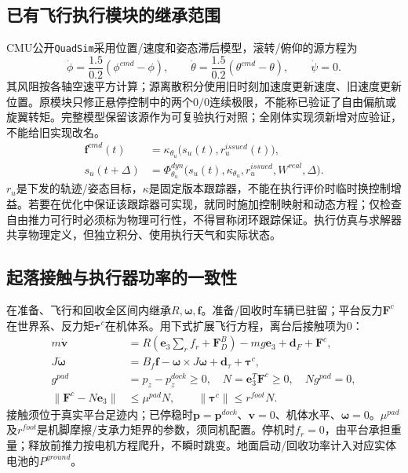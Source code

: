 \subsection*{已有飞行执行模块的继承范围}
\noindent CMU公开\texttt{QuadSim}采用位置/速度和姿态滞后模型，滚转/俯仰的源方程为
\begin{equation}
 \dot\phi=\frac{1.5}{0.2}(\phi^{cmd}-\phi),\qquad
 \dot\theta=\frac{1.5}{0.2}(\theta^{cmd}-\theta),\qquad\dot\psi=0.
 \label{eng:eq:cmudynamics}
\end{equation}
\noindent 其风阻按各轴空速平方计算；源离散积分使用旧时刻加速度更新速度、旧速度更新位置。原模块只修正悬停控制中的两个$0/0$连续极限，不能称已验证了自由偏航或旋翼转矩。完整模型保留该源作为可复验执行对照；全刚体实现须新增对应验证，不能给旧实现改名。
\begin{align}
 \mathbf f^{cmd}(t)&=\kappa_{\theta_u}\big(s_u(t),r_u^{issued}(t)\big),\\
 s_u(t+\Delta)&=\Phi^{dyn}_{\theta_u}\big(s_u(t),\kappa_{\theta_u},
                          r_u^{issued},W^{real},\Delta\big).
 \label{eng:eq:trackingplant}
\end{align}
\noindent $r_u$是下发的轨迹/姿态目标，$\kappa$是固定版本跟踪器，不能在执行评价时临时换控制增益。若要在优化中保证该跟踪器可实现，就同时施加控制映射和动态方程；仅检查自由推力可行时必须标为物理可行性，不得冒称闭环跟踪保证。执行仿真与求解器共享物理定义，但独立积分、使用执行天气和实际状态。
\clearpage\subsection*{起落接触与执行器功率的一致性}
\noindent 在准备、飞行和回收全区间内继承$R,\boldsymbol\omega,\mathbf f$。准备/回收时车辆已驻留；平台反力$\mathbf F^c$在世界系、反力矩$\boldsymbol\tau^c$在机体系。用下式扩展飞行方程，离台后接触项为0：
\begin{align}
 m\dot{\mathbf v}&=R(\mathbf e_3\textstyle\sum_r f_r+\mathbf F_D^B)-mg\mathbf e_3+\mathbf d_F+\mathbf F^c,\\
 J\dot{\boldsymbol\omega}&=B_f\mathbf f-\boldsymbol\omega\times J\boldsymbol\omega+\mathbf d_\tau+\boldsymbol\tau^c,\\
 g^{pad}&=p_z-p_z^{dock}\ge0,\quad N=\mathbf e_3^T\mathbf F^c\ge0,\quad Ng^{pad}=0,\\
 \|\mathbf F^c-N\mathbf e_3\|&\le\mu^{pad}N,\qquad \|\boldsymbol\tau^c\|\le r^{foot}N.
 \label{eng:eq:contactdynamics}
\end{align}
\noindent 接触须位于真实平台足迹内；已停稳时$\mathbf p=\mathbf p^{dock}$、$\mathbf v=0$、机体水平、$\boldsymbol\omega=0$。$\mu^{pad}$及$r^{foot}$是机脚摩擦/支承力矩界的参数，须同机配置。停机时$f_r=0$，由平台承担重量；释放前推力按电机方程爬升，不瞬时跳变。地面启动/回收功率计入对应实体电池的$P^{ground}$。
